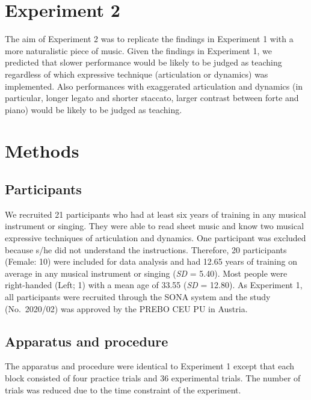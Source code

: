 \documentclass[
  man,floatsintext]{apa6}
\begin{document}
\clearpage

\hypertarget{experiment-2}{%
\section{Experiment 2}\label{experiment-2}}

The aim of Experiment 2 was to replicate the findings in Experiment 1 with a more naturalistic piece of music. Given the findings in Experiment 1, we predicted that slower performance would be likely to be judged as teaching regardless of which expressive technique (articulation or dynamics) was implemented. Also performances with exaggerated articulation and dynamics (in particular, longer legato and shorter staccato, larger contrast between forte and piano) would be likely to be judged as teaching.

\hypertarget{methods-1}{%
\section{Methods}\label{methods-1}}

\hypertarget{participants-1}{%
\subsection{Participants}\label{participants-1}}

We recruited 21 participants who had at least six years of training in any musical instrument or singing. They were able to read sheet music and know two musical expressive techniques of articulation and dynamics. One participant was excluded because s/he did not understand the instructions. Therefore, 20 participants (Female: 10) were included for data analysis and had 12.65 years of training on average in any musical instrument or singing (\emph{SD} = 5.40). Most people were right-handed (Left; 1) with a mean age of 33.55 (\emph{SD} = 12.80). As Experiment 1, all participants were recruited through the SONA system and the study (No.~2020/02) was approved by the PREBO CEU PU in Austria.

\hypertarget{apparatus-and-procedure}{%
\subsection{Apparatus and procedure}\label{apparatus-and-procedure}}

The apparatus and procedure were identical to Experiment 1 except that each block consisted of four practice trials and 36 experimental trials. The number of trials was reduced due to the time constraint of the experiment.
\end{document}
